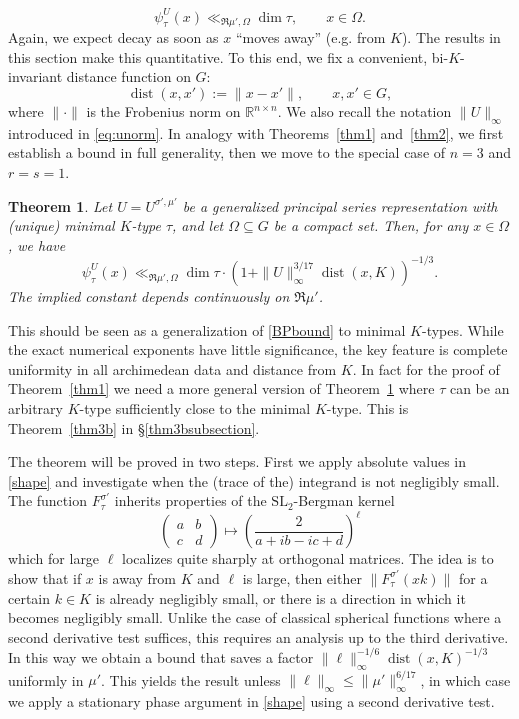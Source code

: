 \documentclass[11pt,oneside]{amsart}
\numberwithin{equation}{section}
\theoremstyle{remark}
\theoremstyle{plain}
\newtheorem{theorem}{Theorem}
\DeclareMathOperator{\dist}{dist}
\newcommand\SL{\mathrm{SL}}
\newcommand\RR{\mathbb{R}}
\renewcommand\leq{\leqslant}
\begin{document}
\begin{equation}\label{eq:psi-trivial-bound}
\psi^{U}_{\tau}(x) \ll_{\Re\mu',\Omega} \dim \tau,\qquad x\in\Omega.
\end{equation}
Again, we expect decay as soon as $x$ ``moves away'' (e.g. from $K$). The results in this section make this quantitative. To this end, we fix a convenient, bi-$K$-invariant distance function on $G$:
\[\dist(x,x'):=\|x-x'\|,\qquad x,x'\in G,\]
where $\|\cdot\|$ is the Frobenius norm on $\RR^{n\times n}$. We also recall the notation $\|U\|_\infty$ introduced in \eqref{eq:unorm}. In analogy with Theorems~\ref{thm1} and~\ref{thm2}, we first establish a bound in full generality, then we move to the special case of $n=3$ and $r=s=1$.

\begin{theorem}\label{thm3} Let $U=U^{\sigma',\mu'}$ be a generalized principal series representation with (unique) minimal $K$-type $\tau$, and let $\Omega\subseteq G$ be a compact set. Then, for any $x\in\Omega$, we have
\[\psi^{U}_{\tau}(x)\ll_{\Re\mu',\Omega}\dim \tau\cdot\left(1 +\|U\|_{\infty}^{3/17}\dist(x, K)\right)^{-1/3}.\]
The implied constant depends continuously on $\Re\mu'$.
\end{theorem}

This should be seen as a generalization of \eqref{BPbound} to minimal $K$-types. While the exact numerical exponents have little significance, the key feature is complete uniformity in all archimedean data and distance from $K$. In fact for the proof of Theorem~\ref{thm1} we need a more general version of Theorem~\ref{thm3} where $\tau$ can be an arbitrary $K$-type sufficiently close to the minimal $K$-type. This is Theorem~\ref{thm3b} in \S\ref{thm3bsubsection}.

The theorem will be proved in two steps. First we apply absolute values in \eqref{shape} and investigate when the (trace of the) integrand is not negligibly small. The function $F_\tau^{\sigma'}$ inherits properties of the $\SL_2$-Bergman kernel 
$$\left(\begin{matrix} a & b\\ c & d\end{matrix}\right) \mapsto \left( \frac{2}{a + i b - i c + d}\right)^{\ell}$$
which for large $\ell$ localizes quite sharply at orthogonal matrices. The idea is to show that if $x$ is away from $K$ and $\ell$ is large, then either $\| F_\tau^{\sigma'}(xk) \|$ for a certain $k\in K$ is already negligibly small, or there is a direction in which it becomes negligibly small. Unlike the case of classical spherical functions where a second derivative test suffices, this requires an analysis up to the third derivative. In this way we obtain a bound that saves a factor 
$\| \bm \ell\|_{\infty}^{-1/6} \dist(x, K)^{-1/3}$ uniformly in $\mu'$. This yields the result
unless $\| \bm \ell\|_{\infty} \leq \| \mu' \|_{\infty}^{6/17}$, in which case we apply a stationary phase argument in \eqref{shape} using a second derivative test.
\end{document}
